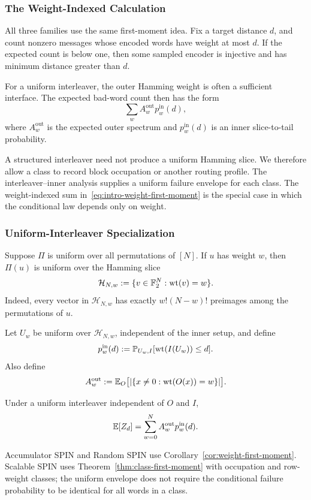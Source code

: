 \subsubsection{The Weight-Indexed Calculation}

All three families use the same first-moment idea. Fix a target distance $d$,
and count nonzero messages whose encoded words have weight at most $d$.
If the expected count is below one, then some sampled encoder is injective and
has minimum distance greater than $d$.

For a uniform interleaver, the outer Hamming weight is often a sufficient
interface. The expected bad-word count then has the form
\begin{equation}
  \sum_w A_w^{\mathrm{out}}p_w^{\mathrm{in}}(d),
  \label{eq:intro-weight-first-moment}
\end{equation}
where $A_w^{\mathrm{out}}$ is the expected outer spectrum and
$p_w^{\mathrm{in}}(d)$ is an inner slice-to-tail probability.

A structured interleaver need not produce a uniform Hamming slice. We
therefore allow a class to record block occupation or another routing profile.
The interleaver--inner analysis supplies a uniform failure envelope for each
class. The weight-indexed sum in~\eqref{eq:intro-weight-first-moment} is the
special case in which the conditional law depends only on weight.

\subsubsection{Uniform-Interleaver Specialization}

Suppose $\Pi$ is uniform over all permutations of $[N]$. If $u$ has
weight $w$, then $\Pi(u)$ is uniform over the Hamming slice
\[
  \mathcal H_{N,w}:=\{v\in\mathbb F_2^N:\operatorname{wt}(v)=w\}.
\]
Indeed, every vector in $\mathcal H_{N,w}$ has exactly
$w!(N-w)!$ preimages among the permutations of $u$.

Let $U_w$ be uniform over $\mathcal H_{N,w}$, independent of the inner
setup, and define
\begin{equation}
  p_w^{\mathrm{in}}(d)
  :=
  \mathbb P_{U_w,I}[\operatorname{wt}(I(U_w))\le d].
  \label{eq:inner-slice-tail}
\end{equation}
Also define
\[
  A_w^{\mathrm{out}}
  :=
  \mathbb E_O\bigl[
    |\{x\ne0:\operatorname{wt}(O(x))=w\}|
  \bigr].
\]

\begin{corollary}
\label{cor:weight-first-moment}
Under a uniform interleaver independent of $O$ and $I$,
\[
  \mathbb E[Z_d]
  =
  \sum_{w=0}^N
  A_w^{\mathrm{out}}p_w^{\mathrm{in}}(d).
\]
\end{corollary}

Accumulator SPIN and Random SPIN use
Corollary~\ref{cor:weight-first-moment}. Scalable SPIN uses
Theorem~\ref{thm:class-first-moment} with occupation and row-weight classes;
the uniform envelope does not require the conditional failure probability to
be identical for all words in a class.

